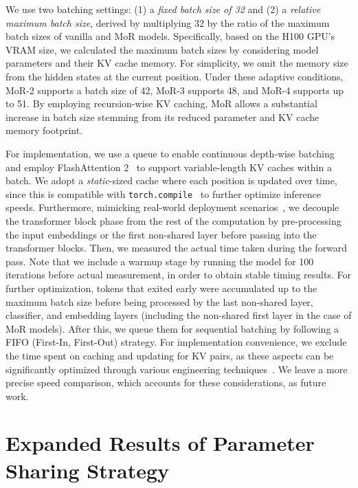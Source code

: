 We use two batching settings: (1) a \textit{fixed batch size of 32} and (2) a \textit{relative maximum batch size}, derived by multiplying 32 by the ratio of the maximum batch sizes of vanilla and MoR models. Specifically, based on the H100 GPU's VRAM size, we calculated the maximum batch sizes by considering model parameters and their KV cache memory. For simplicity, we omit the memory size from the hidden states at the current position. Under these adaptive conditions, MoR-2 supports a batch size of 42, MoR-3 supports 48, and MoR-4 supports up to 51. By employing recursion-wise KV caching, MoR allows a substantial increase in batch size stemming from its reduced parameter and KV cache memory footprint. 


For implementation, we use a queue to enable continuous depth-wise batching and employ FlashAttention 2~\citep{dao2023flashattention} to support variable-length KV caches within a batch. We adopt a \textit{static}-sized cache where each position is updated over time, since this is compatible with \texttt{torch.compile}~\citep{paszke2019pytorch} to further optimize inference speeds. Furthermore, mimicking real-world deployment scenarios~\citep{kwon2023efficient, zhong2024distserve}, we decouple the transformer block phase from the rest of the computation by pre-processing the input embeddings or the first non-shared layer before passing into the transformer blocks. Then, we measured the actual time taken during the forward pass. Note that we include a warmup stage by running the model for 100 iterations before actual measurement, in order to obtain stable timing results. For further optimization, tokens that exited early were accumulated up to the maximum batch size before being processed by the last non-shared layer, classifier, and embedding layers (including the non-shared first layer in the case of MoR models). After this, we queue them for sequential batching by following a FIFO (First-In, First-Out) strategy. For implementation convenience, we exclude the time spent on caching and updating for KV pairs, as these aspects can be significantly optimized through various engineering techniques~\citep{kwon2023efficient}. We leave a more precise speed comparison, which accounts for these considerations, as future work.


\clearpage
\section{Expanded Results of Parameter Sharing Strategy}
\label{app:parameter_sharing}

